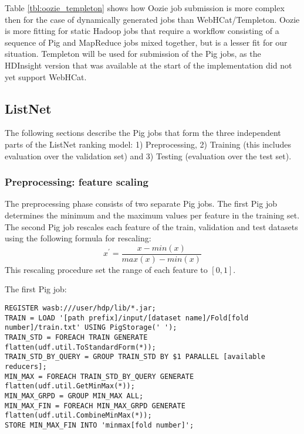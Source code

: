 Table \ref{tbl:oozie_templeton} shows how Oozie job submission is more complex then for the case of dynamically generated jobs than WebHCat/Templeton. Oozie is more fitting for static Hadoop jobs that require a workflow consisting of a sequence of Pig and MapReduce jobs mixed together, but is a lesser fit for our situation. Templeton will be used for submission of the Pig jobs, as the HDInsight version that was available at the start of the implementation did not yet support WebHCat.

\subsection{ListNet}
The following sections describe the Pig jobs that form the three independent parts of the ListNet ranking model: 1) Preprocessing, 2) Training (this includes evaluation over the validation set) and 3) Testing (evaluation over the test set). 
\subsubsection{Preprocessing: feature scaling}
The preprocessing phase consists of two separate Pig jobs. The first Pig job determines the minimum and the maximum values per feature in the training set. The second Pig job rescales each feature of the train, validation and test datasets using the following formula for rescaling:
\begin{equation}
x^{'} = \frac{x-min(x)}{max(x)-min(x)}
\end{equation}
This rescaling procedure set the range of each feature to $[0,1]$. 


The first Pig job:
\begin{lstlisting}
REGISTER wasb:///user/hdp/lib/*.jar;
TRAIN = LOAD '[path prefix]/input/[dataset name]/Fold[fold number]/train.txt' USING PigStorage(' ');
TRAIN_STD = FOREACH TRAIN GENERATE flatten(udf.util.ToStandardForm(*));
TRAIN_STD_BY_QUERY = GROUP TRAIN_STD BY $1 PARALLEL [available reducers];
MIN_MAX = FOREACH TRAIN_STD_BY_QUERY GENERATE flatten(udf.util.GetMinMax(*));
MIN_MAX_GRPD = GROUP MIN_MAX ALL;
MIN_MAX_FIN = FOREACH MIN_MAX_GRPD GENERATE flatten(udf.util.CombineMinMax(*));
STORE MIN_MAX_FIN INTO 'minmax[fold number]';
\end{lstlisting}

